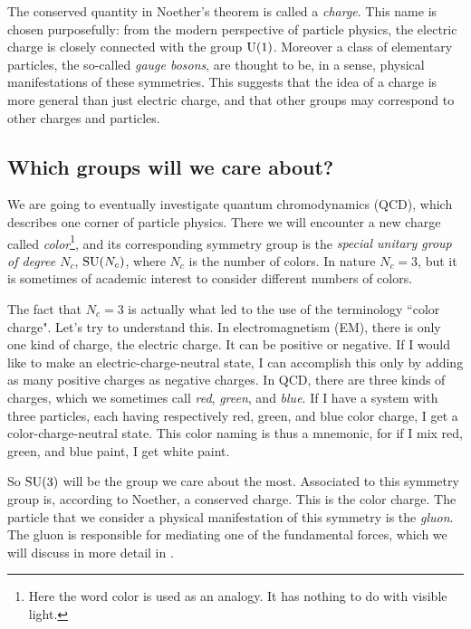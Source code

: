 The conserved quantity in Noether's theorem is called a {\it charge}.
This name is chosen purposefully: from the modern perspective of particle
physics, the electric charge is closely connected with the group $\operatorname{U}(1)$. 
Moreover a class of elementary particles, the so-called 
{\it gauge bosons}, are thought to be, in a sense, physical manifestations of
these symmetries. This suggests that the idea of a charge is more general than
just electric charge, and that other groups may correspond to other charges and
particles.


\subsection{Which groups will we care about?}

We are going to eventually investigate quantum chromodynamics (QCD), which describes
one corner of particle physics. There we will encounter a new charge called
{\it color}\footnote{Here the word color is used as an analogy. It has nothing
to do with visible light.}, and its corresponding symmetry group is the
{\it special unitary group of degree $N_c$}, $\operatorname{SU}(N_c)$, where $N_c$ is the number of
colors. In nature $N_c=3$, but it is sometimes of academic interest to consider
different numbers of colors.

The fact that $N_c=3$ is actually what led to the use of the
terminology ``color charge". Let's try to understand this. 
In electromagnetism (EM), there is only one kind of charge,
the electric charge. It can be positive or negative. If I
would like to make an electric-charge-neutral state, I can accomplish this only
by adding as many positive charges as negative charges.
In QCD, there are three kinds of charges, which we sometimes call {\it red},
{\it green}, and {\it blue}. If I have a system with three particles, each
having respectively red, green, and blue color charge, I get a 
color-charge-neutral state. This color naming is thus a mnemonic, for if I mix
red, green, and blue paint, I get white paint.

So $\operatorname{SU}(3)$ will be the group we care about the most. Associated to this
symmetry group is, according to Noether, a conserved charge. This is the color
charge. The particle that we consider a physical manifestation of this symmetry
is the {\it gluon}. The gluon is responsible for mediating one of
the fundamental forces, which we will discuss in more detail in .


